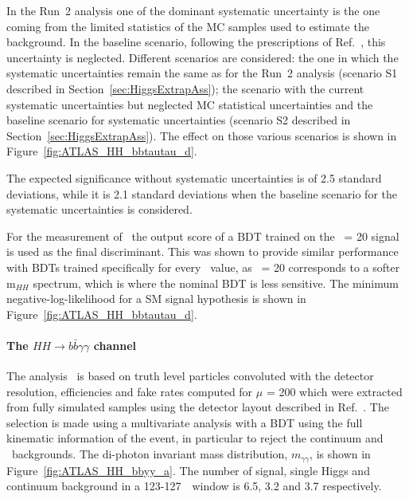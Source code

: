 In the Run~2 analysis one of the dominant systematic uncertainty is the one coming from the limited statistics of the MC samples used to estimate the background. In the baseline scenario, following the prescriptions of Ref.~\cite{ATLAS_PERF_Note}, this uncertainty is neglected.
Different scenarios are considered: the one in which the systematic uncertainties remain the same as for the Run~2 analysis (scenario S1 described in Section~\ref{sec:HiggsExtrapAss}); the scenario with the current systematic uncertainties but neglected MC statistical uncertainties and the baseline scenario for systematic uncertainties (scenario S2 described in Section~\ref{sec:HiggsExtrapAss}). The effect on those various scenarios is shown in Figure~\ref{fig:ATLAS_HH_bbtautau_d}.

The expected significance without systematic uncertainties is of 2.5 standard deviations, while it is 2.1 standard deviations when the baseline scenario for the systematic uncertainties is considered.

For the measurement of \kl\ the output score of a BDT trained on the \kl\ = 20 signal is used as the final discriminant. This was shown to provide similar performance with BDTs trained specifically for every \kl\ value, as \kl\ = 20 corresponds to a softer m$_{HH}$ spectrum, which is where the nominal BDT is less sensitive.
The minimum negative-log-likelihood for a SM signal hypothesis is shown in Figure~\ref{fig:ATLAS_HH_bbtautau_d}.




%
\paragraph{The $HH \rightarrow b\bar{b}\gamma\gamma$ channel}


The analysis~\cite{ATLASHHPUBnote} is based on truth level particles convoluted with the detector resolution, efficiencies and fake rates computed for $\mu$ = 200 which were extracted from fully simulated samples using the detector layout described in Ref.~\cite{ITKPixelTDR}. The selection is made using a multivariate analysis with a BDT using the full kinematic information of the event, in particular to reject the continuum and \ttH\ backgrounds. 
The di-photon invariant mass distribution, $\ensuremath{m_{\gamma\gamma}}$, is shown in Figure~\ref{fig:ATLAS_HH_bbyy_a}. The number of signal, single Higgs and continuum background in a 123-127~\GeV\ window is 6.5, 3.2 and 3.7 respectively.

